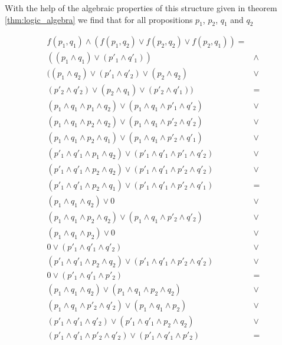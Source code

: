 With the help of the algebraic properties of this structure given in theorem \ref{thm:logic_algebra} we find that for all propositions $p_1$, $p_2$, $q_1$ and $q_2$

\begin{align}
f(p_1,q_1)\wedge (f(p_1,q_2)\vee f(p_2,q_2)\vee f(p_2,q_1)) = \nonumber \\
((p_1\wedge q_1)\vee (p'_1 \wedge q'_1))&\wedge \nonumber \\
((p_1\wedge q_2)\vee (p'_1 \wedge q'_2)\vee(p_2\wedge q_2) &\vee \nonumber \\ 
(p'_2 \wedge q'_2)\vee(p_2\wedge q_1)\vee (p'_2 \wedge q'_1))& = \nonumber  \\ 
(p_1\wedge q_1\wedge  p_1\wedge q_2)\vee (p_1\wedge q_1\wedge  p'_1 \wedge q'_2)&\vee \nonumber \\
(p_1\wedge q_1\wedge  p_2\wedge q_2)\vee (p_1\wedge q_1\wedge  p'_2 \wedge q'_2)&\vee \nonumber \\
(p_1\wedge q_1\wedge  p_2\wedge q_1)\vee (p_1\wedge q_1\wedge  p'_2 \wedge q'_1)&\vee \nonumber \\
(p'_1\wedge q'_1\wedge  p_1\wedge q_2)\vee (p'_1\wedge q'_1\wedge  p'_1 \wedge q'_2)&\vee \nonumber \\
(p'_1\wedge q'_1\wedge  p_2\wedge q_2)\vee (p'_1\wedge q'_1\wedge  p'_2 \wedge q'_2)&\vee \nonumber \\
(p'_1\wedge q'_1\wedge  p_2\wedge q_1)\vee (p'_1\wedge q'_1\wedge  p'_2 \wedge q'_1)&= \nonumber \\
(p_1\wedge q_1 \wedge q_2)\vee 0 & \vee \nonumber \\
(p_1\wedge q_1\wedge  p_2\wedge q_2)\vee (p_1\wedge q_1\wedge  p'_2 \wedge q'_2)&\vee \nonumber \\
(p_1\wedge q_1\wedge  p_2)\vee 0 & \vee \nonumber \\
0\vee (p'_1\wedge q'_1 \wedge q'_2) & \vee \nonumber \\
(p'_1\wedge q'_1\wedge  p_2\wedge q_2)\vee (p'_1\wedge q'_1\wedge  p'_2 \wedge q'_2) & \vee\nonumber \\
0\vee (p'_1\wedge q'_1\wedge  p'_2 )&=  \\ 
(p_1\wedge q_1 \wedge q_2)\vee(p_1\wedge q_1\wedge  p_2\wedge q_2)&\vee\nonumber \\
(p_1\wedge q_1\wedge  p'_2 \wedge q'_2)\vee (p_1\wedge q_1\wedge  p_2)&\vee\nonumber  \\
(p'_1\wedge q'_1 \wedge q'_2)\vee (p'_1\wedge q'_1\wedge  p_2\wedge q_2)&\vee \nonumber \\
(p'_1\wedge q'_1\wedge  p'_2 \wedge q'_2)\vee (p'_1\wedge q'_1\wedge  p'_2 )&=  \nonumber \\

\end{align}
